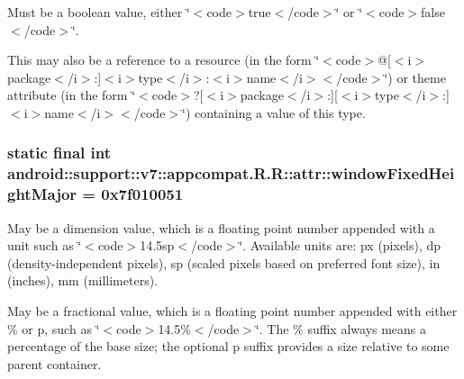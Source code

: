 Must be a boolean value, either \char`\"{}$<$code$>$true$<$/code$>$\char`\"{} or \char`\"{}$<$code$>$false$<$/code$>$\char`\"{}. 

This may also be a reference to a resource (in the form \char`\"{}$<$code$>$@\mbox{[}$<$i$>$package$<$/i$>$:\mbox{]}$<$i$>$type$<$/i$>$:$<$i$>$name$<$/i$>$$<$/code$>$\char`\"{}) or theme attribute (in the form \char`\"{}$<$code$>$?\mbox{[}$<$i$>$package$<$/i$>$:\mbox{]}\mbox{[}$<$i$>$type$<$/i$>$:\mbox{]}$<$i$>$name$<$/i$>$$<$/code$>$\char`\"{}) containing a value of this type. \hypertarget{classandroid_1_1support_1_1v7_1_1appcompat_1_1_r_1_1attr_a88c86c89d381e31186c64bd3205101c}{
\subsubsection[{windowFixedHeightMajor}]{\setlength{\rightskip}{0pt plus 5cm}static final int android::support::v7::appcompat.R.R::attr::windowFixedHeightMajor = 0x7f010051}}
\label{classandroid_1_1support_1_1v7_1_1appcompat_1_1_r_1_1attr_a88c86c89d381e31186c64bd3205101c}


May be a dimension value, which is a floating point number appended with a unit such as \char`\"{}$<$code$>$14.5sp$<$/code$>$\char`\"{}. Available units are: px (pixels), dp (density-independent pixels), sp (scaled pixels based on preferred font size), in (inches), mm (millimeters). 

May be a fractional value, which is a floating point number appended with either \% or p, such as \char`\"{}$<$code$>$14.5\%$<$/code$>$\char`\"{}. The \% suffix always means a percentage of the base size; the optional p suffix provides a size relative to some parent container. 

